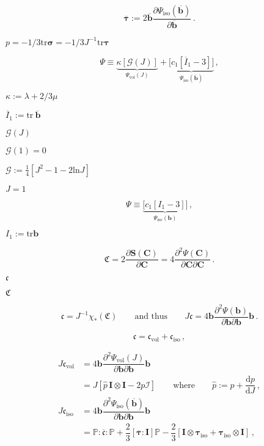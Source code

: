 \documentclass{article}
\begin{document}
\[ \overline{\boldsymbol{\tau}} := 2 \overline{\mathbf{b}} \dfrac{\partial \Psi_{\textrm{iso}}(\overline{\mathbf{b}})}{\partial \overline{\mathbf{b}}} \, . \]
\pagebreak

$p = - 1/3 \textrm{tr} \boldsymbol{\sigma} = - 1/3 J^{-1} \textrm{tr} \boldsymbol{\tau}$
\pagebreak

\[ \Psi \equiv \underbrace{\kappa [ \mathcal{G}(J) ] }_{\Psi_{\textrm{vol}}(J)} + \underbrace{\bigl[c_1 [ \overline{I}_1 - 3] \bigr]}_{\Psi_{\text{iso}}(\overline{\mathbf{b}})} \, , \]
\pagebreak

$\kappa := \lambda + 2/3 \mu$
\pagebreak

$\overline{I}_1 := \textrm{tr}\ \overline{\mathbf{b}}$
\pagebreak

$\mathcal{G}(J)$
\pagebreak

$\mathcal{G}(1) = 0$
\pagebreak

$\mathcal{G}:=\frac{1}{4} [ J^2 - 1 - 2\textrm{ln}J ]$
\pagebreak

$J=1$
\pagebreak

\[ \Psi \equiv \underbrace{\bigl[ c_1 [ I_1 - 3] \bigr] }_{\Psi_{\textrm{iso}}(\mathbf{b})} \, , \]
\pagebreak

$ I_1 := \textrm{tr}\mathbf{b} $
\pagebreak

\[ \mathfrak{C} = 2\dfrac{\partial \mathbf{S}(\mathbf{C})}{\partial \mathbf{C}} = 4\dfrac{\partial^2 \Psi(\mathbf{C})}{\partial \mathbf{C} \partial \mathbf{C}} \, . \]
\pagebreak

$\mathfrak{c}$
\pagebreak

$\mathfrak{C}$
\pagebreak

\[ \mathfrak{c} = J^{-1} \chi_{*}(\mathfrak{C}) \qquad \text{and thus} \qquad J\mathfrak{c} = 4 \mathbf{b} \dfrac{\partial^2 \Psi(\mathbf{b})} {\partial \mathbf{b} \partial \mathbf{b}} \mathbf{b} \, . \]
\pagebreak

\[ \mathfrak{c} = \mathfrak{c}_{\text{vol}} + \mathfrak{c}_{\text{iso}} \, , \]
\pagebreak

\begin{align*} J \mathfrak{c}_{\text{vol}} &= 4 \mathbf{b} \dfrac{\partial^2 \Psi_{\text{vol}}(J)} {\partial \mathbf{b} \partial \mathbf{b}} \mathbf{b} \\ &= J[\widehat{p}\, \mathbf{I} \otimes \mathbf{I} - 2p \mathcal{I}] \qquad \text{where} \qquad \widehat{p} := p + \dfrac{\textrm{d} p}{\textrm{d}J} \, , \\ J \mathfrak{c}_{\text{iso}} &= 4 \mathbf{b} \dfrac{\partial^2 \Psi_{\text{iso}}(\overline{\mathbf{b}})} {\partial \mathbf{b} \partial \mathbf{b}} \mathbf{b} \\ &= \mathbb{P} : \mathfrak{\overline{c}} : \mathbb{P} + \dfrac{2}{3}[\overline{\boldsymbol{\tau}}:\mathbf{I}]\mathbb{P} - \dfrac{2}{3}[ \mathbf{I}\otimes\boldsymbol{\tau}_{\text{iso}} + \boldsymbol{\tau}_{\text{iso}} \otimes \mathbf{I} ] \, , \end{align*}
\pagebreak
\end{document}
